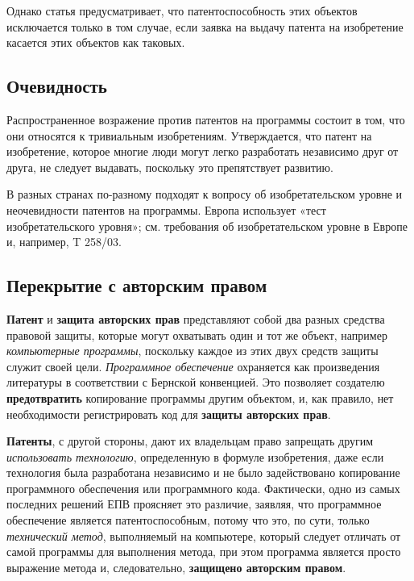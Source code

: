 \documentclass[12pt, oneside, a4paper]{article}
\begin{document}
\begin{sloppypar}
Однако статья предусматривает, что патентоспособность этих объектов исключается только в том случае, если заявка на выдачу патента на изобретение касается этих объектов как таковых.\\
\subsection{Очевидность}
Распространенное возражение против патентов на программы состоит в том, что они относятся к тривиальным изобретениям. Утверждается, что патент на изобретение, которое многие люди могут легко разработать независимо друг от друга, не следует выдавать, поскольку это препятствует развитию. 

В разных странах по-разному подходят к вопросу об изобретательском уровне и неочевидности патентов на программы. Европа использует «тест изобретательского уровня»; см. требования об изобретательском уровне в Европе и, например, T 258/03.\\ 


\subsection{Перекрытие с авторским правом}
\textbf{Патент} и \textbf{защита авторских прав} представляют собой два разных средства правовой защиты, которые могут охватывать один и тот же объект, например \textit{компьютерные программы}, поскольку каждое из этих двух средств защиты служит своей цели. \textit{Программное обеспечение} охраняется как произведения литературы в соответствии с Бернской конвенцией. Это позволяет создателю \textbf{предотвратить} копирование программы другим объектом, и, как правило, нет необходимости регистрировать код для \textbf{защиты авторских прав}. 

\textbf{Патенты}, с другой стороны, дают их владельцам право запрещать другим \textit{использовать технологию}, определенную в формуле изобретения, даже если технология была разработана независимо и не было задействовано копирование программного обеспечения или программного кода. Фактически, одно из самых последних решений ЕПВ проясняет это различие, заявляя, что программное обеспечение является патентоспособным, потому что это, по сути, только \textit{технический метод}, выполняемый на компьютере, который следует отличать от самой программы для выполнения метода, при этом программа является просто выражение метода и, следовательно, \textbf{защищено авторским правом}.


\end{sloppypar}
\end{document}
